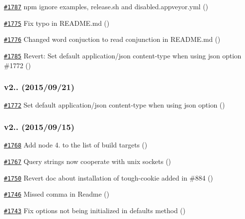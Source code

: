 \begin{DoxyItemize}
\item \href{https://github.com/request/request/pull/1787}{\tt \#1787} npm ignore examples, release.\+sh and disabled.\+appveyor.\+yml ()
\item \href{https://github.com/request/request/pull/1775}{\tt \#1775} Fix typo in R\+E\+A\+D\+M\+E.\+md ()
\item \href{https://github.com/request/request/pull/1776}{\tt \#1776} Changed word \textquotesingle{}conjuction\textquotesingle{} to read \textquotesingle{}conjunction\textquotesingle{} in R\+E\+A\+D\+M\+E.\+md ()
\item \href{https://github.com/request/request/pull/1785}{\tt \#1785} Revert\+: Set default application/json content-\/type when using json option \#1772 ()
\end{DoxyItemize}

\subsubsection*{v2.. (2015/09/21)}


\begin{DoxyItemize}
\item \href{https://github.com/request/request/pull/1772}{\tt \#1772} Set default application/json content-\/type when using json option ()
\end{DoxyItemize}

\subsubsection*{v2.. (2015/09/15)}


\begin{DoxyItemize}
\item \href{https://github.com/request/request/pull/1768}{\tt \#1768} Add node 4. to the list of build targets ()
\item \href{https://github.com/request/request/pull/1767}{\tt \#1767} Query strings now cooperate with unix sockets ()
\item \href{https://github.com/request/request/pull/1750}{\tt \#1750} Revert doc about installation of tough-\/cookie added in \#884 ()
\item \href{https://github.com/request/request/pull/1746}{\tt \#1746} Missed comma in Readme ()
\item \href{https://github.com/request/request/pull/1743}{\tt \#1743} Fix options not being initialized in defaults method ()
\end{DoxyItemize}

